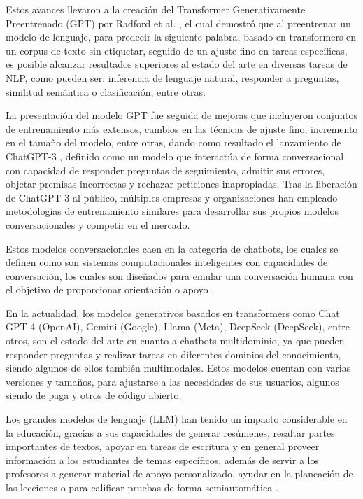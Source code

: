 Estos avances llevaron a la creación del Transformer Generativamente Preentrenado
(GPT) por Radford et al. \cite{radford_improving_2018}, el cual demostró que al
preentrenar un modelo de lenguaje, para predecir la siguiente palabra, basado en
transformers en un corpus de texto sin etiquetar, seguido de un ajuste fino en tareas
específicas, es posible alcanzar resultados superiores al estado del arte en diversas
tareas de NLP, como pueden ser: inferencia de lenguaje natural, responder a preguntas,
similitud semántica o clasificación, entre otras.

La presentación del modelo GPT fue seguida de mejoras que incluyeron conjuntos de
entrenamiento más extensos, cambios en las técnicas de ajuste fino, incremento en
el tamaño del modelo, entre otras, dando como resultado el lanzamiento de
ChatGPT-3 \cite{openai_introducing_2022}, definido como un modelo que interactúa de forma
conversacional con capacidad de responder preguntas de seguimiento, admitir sus
errores, objetar premisas incorrectas y rechazar peticiones inapropiadas. Tras
la liberación de ChatGPT-3 al público, múltiples empresas y organizaciones han
empleado metodologías de entrenamiento similares para desarrollar sus propios
modelos conversacionales y competir en el mercado.

Estos modelos conversacionales caen en la categoría de chatbots, los cuales se
definen como son sistemas computacionales inteligentes con capacidades de conversación,
los cuales son diseñados para emular una conversación humana con el objetivo de
proporcionar orientación o apoyo \cite{caldarini_literature_2022}.

En la actualidad, los modelos generativos basados en transformers como Chat GPT-4
(OpenAI), Gemini (Google), Llama (Meta), DeepSeek (DeepSeek), entre otros, son el
estado del arte en cuanto a chatbots multidominio, ya que pueden responder preguntas
y realizar tareas en diferentes dominios del conocimiento, siendo algunos de ellos
también multimodales. Estos modelos cuentan con varias versiones y tamaños, para
ajustarse a las necesidades de sus usuarios, algunos siendo de paga y otros de
código abierto.

Los grandes modelos de lenguaje (LLM) han tenido un impacto considerable en la
educación, gracias a sus capacidades de generar resúmenes, resaltar partes
importantes de textos, apoyar en tareas de escritura y en general proveer información
a los estudiantes de temas específicos, además de servir a los profesores a generar
material de apoyo personalizado, ayudar en la planeación de las lecciones o para
calificar pruebas de forma semiautomática \cite{kasneci_chatgpt_2023}.

